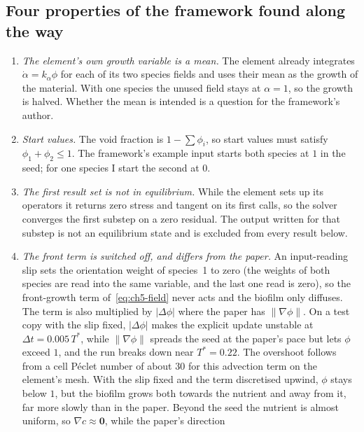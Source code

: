 \subsection{Four properties of the framework found along the way}
\begin{enumerate}
\item \emph{The element's own growth variable is a mean.} The element already
      integrates $\dot\alpha=k_\alpha\phi$ for each of its two species fields
      and uses their mean as the growth of the material. With one species the
      unused field stays at $\alpha=1$, so the growth is halved. Whether the
      mean is intended is a question for the framework's author.
\item \emph{Start values.} The void fraction is $1-\sum\phi_i$, so start
      values must satisfy $\phi_1+\phi_2\le1$. The framework's example
      input starts both species at $1$ in the seed; for one species I start the
      second at $0$.
\item \emph{The first result set is not in equilibrium.} While the element
      sets up its operators it returns zero stress and tangent on its first
      calls, so the solver converges the first substep on a zero residual. The
      output written for that substep is not an equilibrium state and is
      excluded from every result below.
\item \emph{The front term is switched off, and differs from the paper.}
      An input-reading slip sets the orientation weight of species~1 to zero
      (the weights of both species are read into the same variable, and the
      last one read is zero), so the front-growth term
      of~\eqref{eq:ch5-field} never acts and the biofilm only diffuses. The
      term is also multiplied by $|\Delta\phi|$ where the paper has
      $\|\nabla\phi\|$. On a test copy with the slip fixed, $|\Delta\phi|$
      makes the explicit update unstable at $\Delta t=0.005\,T^*$, while
      $\|\nabla\phi\|$ spreads the seed at the paper's pace but lets
      $\phi$ exceed $1$, and the run breaks down near $T^*=0.22$. The
      overshoot follows from a cell P\'eclet number of about $30$ for this
      advection term on the element's mesh. With the slip fixed and the term
      discretised upwind, $\phi$ stays below $1$, but the biofilm grows
      both towards the nutrient and away from it, far more slowly than in the
      paper. Beyond the seed the nutrient is almost uniform, so
      $\nabla c\approx\mathbf 0$, while the paper's direction

\end{enumerate}
